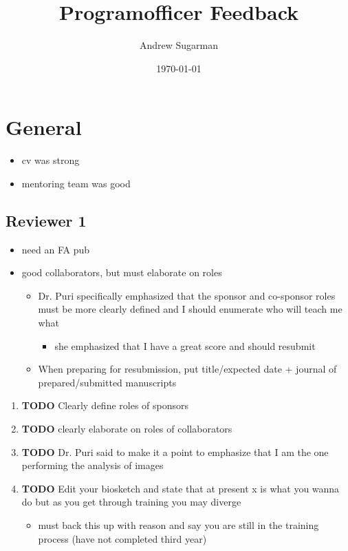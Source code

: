 \documentclass[11pt]{article}
\author{Andrew Sugarman}
\date{\today}
\title{Programofficer Feedback}
\begin{document}
\maketitle
\tableofcontents

\section{General}
\label{sec:orgfaa628e}
\begin{itemize}
\item cv was strong
\item mentoring team was good
\end{itemize}
\subsection{Reviewer 1}
\label{sec:org3868453}
\begin{itemize}
\item need an FA pub
\item good collaborators, but must elaborate on roles
\begin{itemize}
\item Dr. Puri specifically emphasized that the sponsor and co-sponsor roles must be more clearly defined and I should enumerate who will teach me what
\begin{itemize}
\item she emphasized that I have a great score and should resubmit
\end{itemize}
\item When preparing for resubmission, put title/expected date + journal of prepared/submitted manuscripts
\end{itemize}
\end{itemize}
\begin{enumerate}
\item {\bfseries\sffamily TODO} Clearly define roles of sponsors
\label{sec:org279074b}
\item {\bfseries\sffamily TODO} clearly elaborate on roles of collaborators
\label{sec:orgbac5fd9}
\item {\bfseries\sffamily TODO} Dr. Puri said to make it a point to emphasize that I am the one performing the analysis of images
\label{sec:org85ca131}
\item {\bfseries\sffamily TODO} Edit your biosketch and state that at present x is what you wanna do but as you get through training you may diverge
\label{sec:org72d516e}
\begin{itemize}
\item must back this up with reason and say you are still in the training process (have not completed third year)
\end{itemize}
\end{enumerate}
\end{document}
